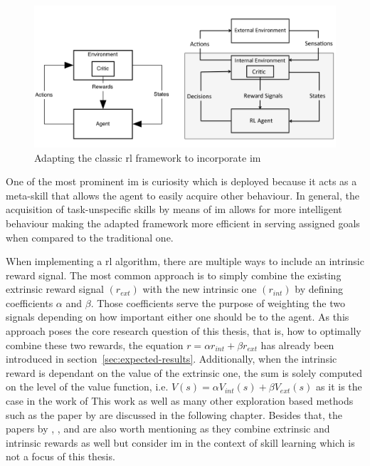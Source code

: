 \documentclass[draft,final]{vutinfth} %
\newcommand{\p}[1]{see p. #1}
\begin{document}
    \begin{figure}[h]
        \centering
        \includegraphics[width=\textwidth]{figures/adapted_rl_framework.png}
        \caption[Adapting the classic \gls{rl} framework to incorporate \gls{im}]{Adapting the classic \gls{rl} framework to incorporate \gls{im}\protect\footnotemark[4]}
        \label{fig:adapted_rl_framework}
    \end{figure}

    \footnotetext[4]{\citep[\p{2}]{singh_intrinsically_2010}}

    One of the most prominent \gls{im} is curiosity which is deployed because it acts as a meta-skill that allows the agent to easily acquire other behaviour.
    In general, the acquisition of task-unspecific skills by means of \gls{im} allows for more intelligent behaviour making the adapted framework more efficient in serving assigned goals when compared to the traditional one.

    When implementing a \gls{rl} algorithm, there are multiple ways to include an intrinsic reward signal.
    The most common approach is to simply combine the existing extrinsic reward signal $(r_{ext})$ with the new intrinsic one $(r_{int})$ by defining coefficients $\alpha$ and $\beta$.
    Those coefficients serve the purpose of weighting the two signals depending on how important either one should be to the agent.
    As this approach poses the core research question of this thesis, that is, how to optimally combine these two rewards, the equation $r = \alpha r_{int} + \beta r_{ext}$ has already been introduced in section~\ref{sec:expected-results}.
    Additionally, when the intrinsic reward is dependant on the value of the extrinsic one, the sum is solely computed on the level of the value function, i.e. $V(s)=\alpha V_{int}(s) + \beta V_{ext}(s)$ as it is the case in the work of \citeauthor{kim_curiosity-bottleneck_2019-1}
    This work as well as many other exploration based methods such as the paper by \citeauthor{burda_exploration_2018} are discussed in the following chapter.
    Besides that, the papers by \citeauthor{gregor_variational_2016}, \citeauthor{vezhnevets_feudal_2017}, and \citeauthor{huang_learning_2019} are also worth mentioning as they combine extrinsic and intrinsic rewards as well but consider \gls{im} in the context of skill learning which is not a focus of this thesis.
\end{document}
